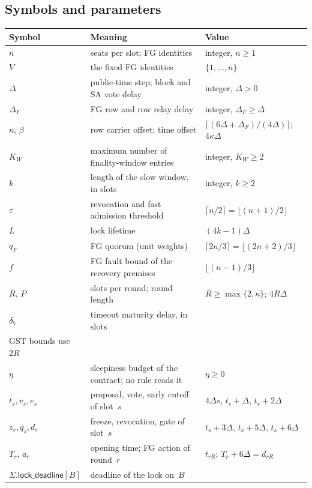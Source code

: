 \documentclass{article}
\theoremstyle{plain}
\theoremstyle{definition}
\theoremstyle{remark}
\newcommand{\lockDeadline}{\mathsf{lock\_deadline}}
\begin{document}
\subsection{Symbols and parameters}\label{sec:parameters}

\begin{center}
\footnotesize
\begin{tabular}{lll}
\hline
Symbol & Meaning & Value\\
\hline
$n$ & seats per slot; FG identities & integer, $n\geq1$\\
$V$ & the fixed FG identities & $\{1,\dots,n\}$\\
$\Delta$ & public-time step; block and SA vote delay & integer, $\Delta>0$\\
$\Delta_F$ & FG row and row relay delay & integer, $\Delta_F\geq\Delta$\\
$\kappa$, $\beta$ & row carrier offset; time offset &
  $\lceil(6\Delta+\Delta_F)/(4\Delta)\rceil$; $4\kappa\Delta$\\
$K_W$ & maximum number of finality-window entries & integer, $K_W\geq2$\\
$k$ & length of the slow window, in slots & integer, $k\geq2$\\
$\tau$ & revocation and fast admission threshold &
  $\lceil n/2\rceil=\lfloor (n+1)/2\rfloor$\\
$L$ & lock lifetime & $(4k-1)\Delta$\\
$q_F$ & FG quorum (unit weights) & $\lceil 2n/3\rceil=\lfloor(2n+2)/3\rfloor$\\
$f$ & FG fault bound of the recovery premises & $\lfloor(n-1)/3\rfloor$\\
$R$, $P$ & slots per round; round length & $R\geq\max\{2,\kappa\}$; $4R\Delta$\\
$\delta_{\rm t}$ & timeout maturity delay, in slots &
  \shortstack[l]{$\delta_{\rm t}\geq0$; Recovery and all\\GST bounds use $2R$}\\
$\eta$ & sleepiness budget of the contract; no rule reads it &
  $\eta\geq0$\\
$t_s,v_s,e_s$ & proposal, vote, early cutoff of slot~$s$ &
  $4\Delta s$, $t_s+\Delta$, $t_s+2\Delta$\\
$z_s,q_s,d_s$ & freeze, revocation, gate of slot~$s$ &
  $t_s+3\Delta$, $t_s+5\Delta$, $t_s+6\Delta$\\
$T_r$, $a_r$ & opening time; FG action of round~$r$ &
  $t_{rR}$; $T_r+6\Delta=d_{rR}$\\
$\Sigma.\lockDeadline[B]$ & deadline of the lock on~$B$ &

\end{tabular}
\end{center}
\end{document}
